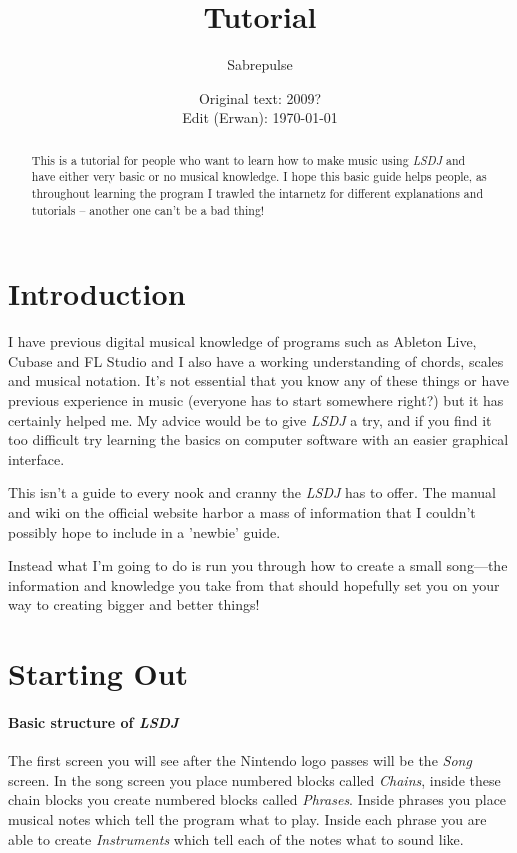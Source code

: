\documentclass[]{article}
\title{\lsdj Tutorial}
\author{Sabrepulse}
\date{Original text: 2009? \\ Edit (Erwan): \today}
\newcommand{\lsdj}{\textit{LSDJ}\xspace}
\begin{document}
\maketitle

\begin{abstract}
This is a tutorial for people who want to learn how to make music using \lsdj and have either very basic or no musical knowledge. I hope this basic guide helps people, as throughout learning the program I trawled the intarnetz for different explanations and tutorials – another one can't be a bad thing!
\end{abstract}


\tableofcontents

\section{Introduction}



I have previous digital musical knowledge of programs such as Ableton Live, Cubase and FL Studio and I also have a working understanding of chords, scales and musical notation. It's not essential that you know any of these things or have previous experience in music (everyone has to start somewhere right?) but it has certainly helped me. My advice would be to give \lsdj a try, and if you find it too difficult try learning the basics on computer software with an easier graphical interface.

This isn't a guide to every nook and cranny the \lsdj has to offer. The manual and wiki on the official website harbor a mass of information that I couldn't possibly hope to include in a 'newbie' guide.

Instead what I'm going to do is run you through how to create a small song---the information and knowledge you take from that should hopefully set you on your way to creating bigger and better things!

\section{Starting Out}



\paragraph{Basic structure of \lsdj}

The first screen you will see after the Nintendo logo passes will be the \textit{Song} screen.
%
In the song screen you place numbered blocks called \textit{Chains}, inside these chain blocks you create numbered blocks called \textit{Phrases}. Inside phrases you place musical notes which tell the program what to play. Inside each phrase you are able to create \textit{Instruments} which tell each of the notes what to sound like.
\end{document}
